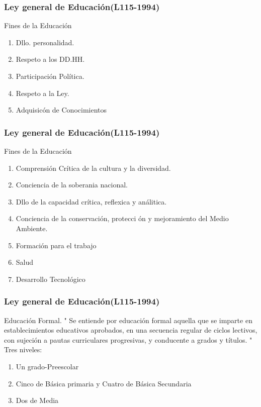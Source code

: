\documentclass{beamer}
\begin{document}
 
\begin{frame}
\frametitle{Ley general de Educaci\'on(L115-1994)}
\begin{block}{Fines de la Educaci\'on}
\begin{enumerate}
\item Dllo. personalidad.
\item Respeto a los DD.HH.
\item Participaci\'on Pol\'itica.
\item Respeto a la Ley.
\item Adquisic\'on de Conocimientos
\end{enumerate}
\end{block}
\end{frame}
\begin{frame}
\frametitle{Ley general de Educaci\'on(L115-1994)}
\begin{block}{Fines de la Educaci\'on}
\begin{enumerate}
\item Comprensi\'on Cr\'itica de la cultura y la diversidad.
\item Conciencia de la soberania nacional. 
\item Dllo de la capacidad cr\'itica, reflexica y an\'alitica.
\item Conciencia   de la conservaci\'on, protecci \'on y mejoramiento del Medio Ambiente. 
\item Formaci\'on para el trabajo 
\item Salud
\item Desarrollo Tecnol\'ogico

\end{enumerate}
\end{block}
\end{frame}
\begin{frame}
\frametitle{Ley general de Educaci\'on(L115-1994)}
\begin{block}{Educaci\'on Formal.}
" Se entiende por educaci\'on formal aquella que se imparte en establecimientos educativos aprobados, en una secuencia regular de ciclos lectivos, con sujeción a pautas
curriculares progresivas, y conducente a grados y t\'itulos. "
\\ Tres niveles: \begin{enumerate}
\item Un grado-Preescolar
\item  Cinco de B\'asica primaria y Cuatro de B\'asica Secundaria
\item  Dos de Media
\end{enumerate}
\end{block}
\end{frame}
\end{document}
